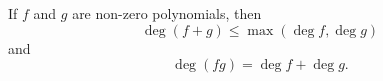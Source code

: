 If $f$ and $g$ are non-zero polynomials, then
$$\deg(f + g) \leq \max(\deg f, \deg g)$$
and
$$\deg(fg) = \deg f + \deg g.$$
